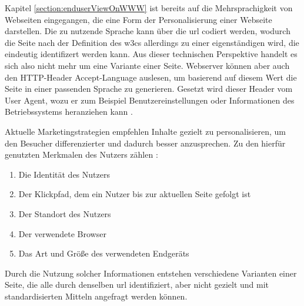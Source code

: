             Kapitel \ref{section:enduserViewOnWWW} ist bereits auf die Mehrsprachigkeit
            von Webseiten eingegangen, die eine Form der Personalisierung einer Webseite darstellen.
            Die zu nutzende Sprache kann über die \gls{url} codiert werden,
            wodurch die Seite nach der Definition des \glspl{w3c} allerdings zu einer eigenständigen {\resource} wird,
            die eindeutig identifizert werden kann.
            Aus dieser technischen Perspektive handelt es sich also nicht mehr um eine Variante einer Seite.
            Webserver können aber auch den HTTP-Header Accept-Language auslesen,
            um basierend auf diesem Wert die Seite in einer passenden Sprache zu generieren.
            Gesetzt wird dieser Header vom User Agent,
            wozu er zum Beispiel Benutzereinstellungen oder Informationen des Betriebssystems heranziehen kann
            \cite[Kapitel 5.3.5, Seite 42]{rfc:7231}.

            Aktuelle Marketingstrategien empfehlen Inhalte gezielt zu personalisieren,
            um den Besucher differenzierter und dadurch besser anzusprechen.
            Zu den hierfür genutzten Merkmalen des Nutzers zählen
            \cite{narongsak:contentPers}:
            
            \begin{enumerate}
                \item Die Identität des Nutzers
                \item Der Klickpfad, dem ein Nutzer bis zur aktuellen Seite gefolgt ist
                \item Der Standort des Nutzers
                \item Der verwendete Browser
                \item Das Art und Größe des verwendeten Endgeräts
            \end{enumerate}

            Durch die Nutzung solcher Informationen entstehen verschiedene Varianten einer Seite,
            die alle durch denselben \gls{url} identifiziert, aber nicht gezielt und mit standardisierten Mitteln
            angefragt werden können.